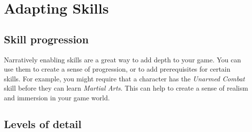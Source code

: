 
\section{Adapting Skills}\label{toolbox:sec:adapting-skills}

\subsection{Skill progression}\label{toolbox:skill-progress}

Narratively enabling skills\label{toolbox:narrative-skills} are a great way to add depth to your game. You can use them to create a sense of progression, or to add prerequisites for certain skills. For example, you might require that a character has the \textit{Unarmed Combat} skill before they can learn \textit{Martial Arts}. This can help to create a sense of realism and immersion in your game world.


\subsection{Levels of detail}\label{toolbox:detailed-skill-lists}
